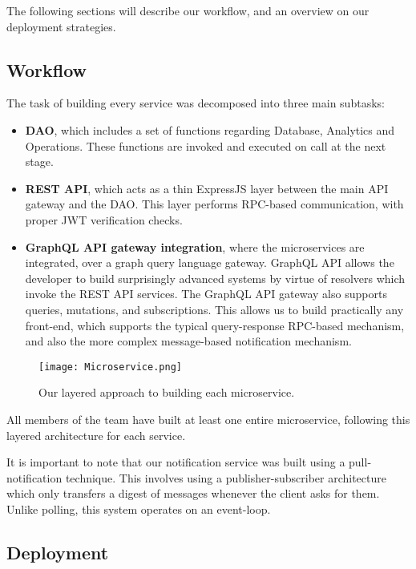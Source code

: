 The following sections will describe our workflow, and an overview on our deployment strategies.

\subsection{Workflow}

The task of building every service was decomposed into three main subtasks:
\begin{itemize}
    \item \textbf{DAO}, which includes a set of functions regarding Database, Analytics and Operations. 
    These functions are invoked and executed on call at the next stage.
    \item \textbf{REST API}, which acts as a thin ExpressJS layer between the main API gateway and the DAO.
    This layer performs RPC-based communication, with proper JWT verification checks.
    \item \textbf{GraphQL API gateway integration}, where the microservices are integrated, over a graph query language gateway.
    GraphQL API allows the developer to build surprisingly advanced systems by virtue of resolvers which invoke the REST API services.
    The GraphQL API gateway also supports queries, mutations, and subscriptions. This allows us to build practically any front-end, which 
    supports the typical query-response RPC-based mechanism, and also the more complex message-based notification mechanism.
\end{itemize}

\begin{figure}[h!]
    \begin{center}
        \texttt{[image: Microservice.png]}
    \end{center}
    \caption{Our layered approach to building each microservice.}
    \label{fig:microservice}
\end{figure}

All members of the team have built at least one entire microservice, following this layered architecture for each service. 

It is important to note that our notification service was built using a pull-notification technique. This involves using a 
publisher-subscriber architecture which only transfers a digest of messages whenever the client asks for them. Unlike polling, 
this system operates on an event-loop.

\subsection{Deployment}

